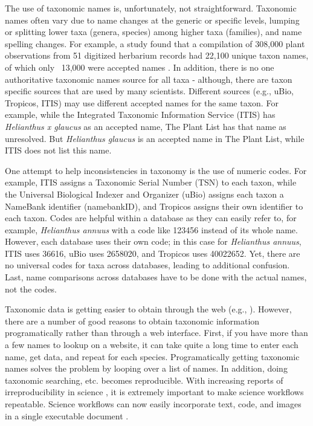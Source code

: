 \documentclass[10pt]{article}\usepackage[]{graphicx}\usepackage[]{color}
\begin{document}
The use of taxonomic names is, unfortunately, not straightforward. Taxonomic names often vary due to name changes at the generic or specific levels, lumping or splitting lower taxa (genera, species) among higher taxa (families), and name spelling changes. For example, a study found that a compilation of 308,000 plant observations from 51 digitized herbarium records had 22,100 unique taxon names, of which only ~13,000 were accepted names \cite{weiser2007,boyle2013}. In addition, there is no one authoritative taxonomic names source for all taxa - although, there are taxon specific sources that are used by many scientists. Different sources (e.g., uBio, Tropicos, ITIS) may use different accepted names for the same taxon. For example, while the Integrated Taxonomic Information Service (ITIS) has \emph{Helianthus x glaucus} as an accepted name, The Plant List \cite{theplantlist} has that name as unresolved. But \emph{Helianthus glaucus} is an accepted name in The Plant List, while ITIS does not list this name. 

One attempt to help inconsistencies in taxonomy is the use of numeric codes. For example, ITIS assigns a Taxonomic Serial Number (TSN) to each taxon, while the Universal Biological Indexer and Organizer (uBio) assigns each taxon a NameBank identifier (namebankID), and Tropicos assigns their own identifier to each taxon. Codes are helpful within a database as they can easily refer to, for example, \emph{Helianthus annuus} with a code like 123456 instead of its whole name. However, each database uses their own code; in this case for \emph{Helianthus annuus}, ITIS uses 36616, uBio uses 2658020, and Tropicos uses 40022652. Yet, there are no universal codes for taxa across databases, leading to additional confusion. Last, name comparisons across databases have to be done with the actual names, not the codes. 

Taxonomic data is getting easier to obtain through the web (e.g., \cite{eol}). However, there are a number of good reasons to obtain taxonomic information programatically rather than through a web interface. First, if you have more than a few names to lookup on a website, it can take quite a long time to enter each name, get data, and repeat for each species. Programatically getting taxonomic names solves the problem by looping over a list of names. In addition, doing taxonomic searching, etc. becomes reproducible. With increasing reports of irreproducibility in science \cite{stodden2010,zimmer2012}, it is extremely important to make science workflows repeatable. Science workflows can now easily incorporate text, code, and images in a single executable document \cite{yihui2013}. 
\end{document}
